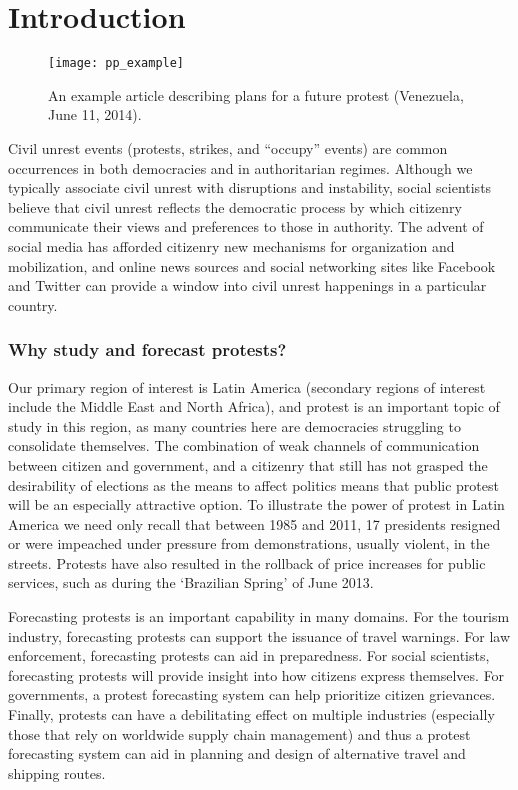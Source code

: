 \section{Introduction}
\begin{figure}[ht]
    \texttt{[image: pp\_example]}
    \caption{An example article describing plans for a future protest (Venezuela, June 11, 2014).}
    \label{pp_example}
\end{figure}
Civil unrest events (protests, strikes, and ``occupy'' events) are common occurrences in both democracies
and in authoritarian regimes.
Although we typically associate civil unrest with disruptions and
instability, social scientists believe that civil unrest reflects the democratic process by 
which citizenry communicate their views and preferences to those in authority. 
The advent of social
media has afforded citizenry new mechanisms for organization and mobilization, and online news sources
and social networking sites like Facebook and Twitter
can provide a window into civil unrest happenings in a particular country.

\subsubsection{Why study and forecast protests?}
Our primary region of interest is Latin America (secondary
regions of interest include the Middle East and North Africa), and protest is an important topic of study in this region, 
as many countries here are democracies struggling to consolidate themselves. The combination of weak channels of communication 
between citizen and government, and a citizenry that still has not grasped the desirability of elections as the means to affect politics 
means that public protest will be an especially attractive option. To 
illustrate the power of protest in Latin America we need only recall 
that between 1985 and 2011, 17 presidents resigned or were impeached under pressure from demonstrations, usually violent, in the streets. Protests have 
also resulted in the rollback of price increases for public services, such as during the ‘Brazilian Spring’ of June 2013.

Forecasting protests is an important capability in many domains.
For the tourism industry, forecasting protests can
support the issuance of travel warnings. For law enforcement,
forecasting protests can aid in preparedness. For social scientists,
forecasting protests will provide insight into how citizens express themselves.
For governments, a protest forecasting system can help prioritize
citizen grievances. Finally, protests can have a debilitating effect on
multiple industries (especially those that rely on worldwide supply chain management)
and thus a protest forecasting system can aid in planning and design
of alternative travel and shipping routes.

